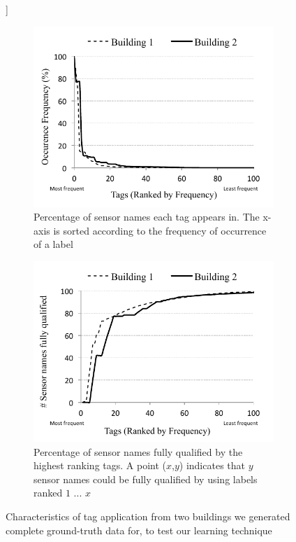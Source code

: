 \begin{figure}[h!]]
\centering
	\begin{subfigure}{0.40\textwidth}
                \centering
		\includegraphics[width=\textwidth]{./figs/pointOccuranceFreq.pdf}
                \caption{Percentage of sensor names each tag appears in. The x-axis is sorted according to the frequency of occurrence of a label}
                \label{fig:labelFreq}
	\end{subfigure}
	\begin{subfigure}{0.40\textwidth}
                \centering
		\includegraphics[width=\textwidth]{./figs/pointCDF.pdf}
                \caption{Percentage of sensor names fully qualified by the highest ranking tags. A point ($x$,$y$) indicates that $y$ sensor names could be fully qualified by using labels ranked $1$ ... $x$}
                \label{fig:pointCDF}
	\end{subfigure}
\caption{Characteristics of tag application from two buildings we generated complete ground-truth data for, to test our learning technique}
\label{fig:buildingLabelCharacteristics}
\end{figure}


